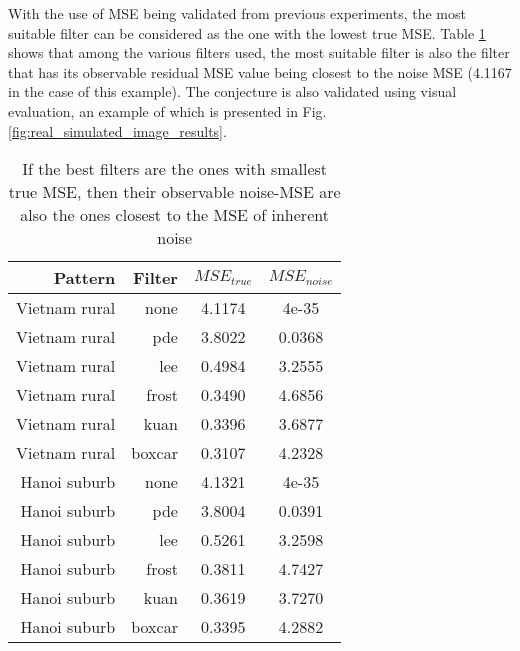 With the use of MSE being validated from previous experiments, 
	the most suitable filter can be considered as the one with the lowest true MSE.
Table \ref{tab:mse_true_noise_log_domain} shows that among the various filters used, 
	the most suitable filter is also the filter that 
		has its observable residual MSE value being closest to the noise MSE (4.1167 in the case of this example).
The conjecture is also validated using visual evaluation, an example of
	which is presented in Fig. \ref{fig:real_simulated_image_results}.

\begin{table}
\centering
\begin{tabular}{r|r|c|c}
Pattern  & Filter  & $MSE_{true}$   & $MSE_{noise}$      \\%
\hline
Vietnam rural	& none		& 4.1174	& 4e-35\\
Vietnam rural	& pde			& 3.8022	& 0.0368\\
Vietnam rural	& lee			& 0.4984	& 3.2555\\
Vietnam rural	& frost		& 0.3490	& 4.6856\\
Vietnam rural	& kuan		& 0.3396	& 3.6877\\
Vietnam rural	& boxcar	& 0.3107	& 4.2328\\
\hline
Hanoi suburb	& none		& 4.1321	& 4e-35\\
Hanoi suburb	& pde			& 3.8004	& 0.0391\\
Hanoi suburb	& lee			& 0.5261	& 3.2598\\
Hanoi suburb	& frost		& 0.3811	& 4.7427\\
Hanoi suburb	& kuan		& 0.3619	& 3.7270\\
Hanoi suburb	& boxcar	& 0.3395	& 4.2882\\
\hline
\end{tabular}

\caption{If the best filters are the ones with smallest true MSE, then their observable noise-MSE are also the ones closest to the MSE of inherent noise}
\label{tab:mse_true_noise_log_domain}
\end{table}


